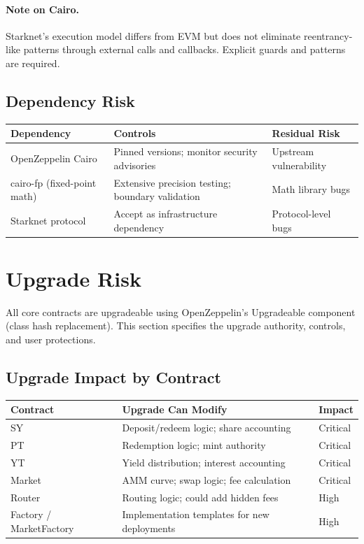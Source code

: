 \paragraph{Note on Cairo.} Starknet's execution model differs from EVM but does not eliminate reentrancy-like patterns through external calls and callbacks. Explicit guards and patterns are required.

\subsection{Dependency Risk}

\begin{center}
\begin{tabular}{lll}
\toprule
\textbf{Dependency} & \textbf{Controls} & \textbf{Residual Risk} \\
\midrule
OpenZeppelin Cairo & Pinned versions; monitor security advisories & Upstream vulnerability \\
cairo-fp (fixed-point math) & Extensive precision testing; boundary validation & Math library bugs \\
Starknet protocol & Accept as infrastructure dependency & Protocol-level bugs \\
\bottomrule
\end{tabular}
\end{center}

\section{Upgrade Risk}

All core contracts are upgradeable using OpenZeppelin's Upgradeable component (class hash replacement). This section specifies the upgrade authority, controls, and user protections.

\subsection{Upgrade Impact by Contract}

\begin{center}
\begin{tabular}{lll}
\toprule
\textbf{Contract} & \textbf{Upgrade Can Modify} & \textbf{Impact} \\
\midrule
SY & Deposit/redeem logic; share accounting & Critical \\
PT & Redemption logic; mint authority & Critical \\
YT & Yield distribution; interest accounting & Critical \\
Market & AMM curve; swap logic; fee calculation & Critical \\
Router & Routing logic; could add hidden fees & High \\
Factory / MarketFactory & Implementation templates for new deployments & High \\
\bottomrule
\end{tabular}
\end{center}

